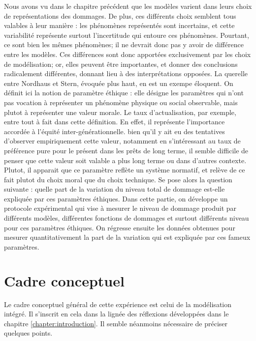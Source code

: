 Nous avons vu dans le chapitre précédent que les modèles varient dans leurs choix de représentations des dommages. De plus, ces différents choix semblent tous valables à leur manière : les phénomènes représentés sont incertains, et cette variabilité représente surtout l'incertitude qui entoure ces phénomènes. Pourtant, ce sont bien les mêmes phénomènes; il ne devrait donc pas y avoir de différence entre les modèles. Ces différences sont donc apportées exclusivement par les choix de modélisation; or, elles peuvent être importantes, et donner des conclusions radicalement différentes, donnant lieu à des interprétations opposées. La querelle entre Nordhaus et Stern, évoquée plus haut, en est un exempe éloquent. On définit ici la notion de paramètre éthique : elle désigne les paramètres qui n'ont pas vocation à représenter un phénomène physique ou social observable, mais plutot à représenter une valeur morale. Le taux d'actualisation, par exemple, entre tout à fait dans cette définition. En effet, il représente l'importance accordée à l'équité inter-générationnelle. bien qu'il y ait eu des tentatives d'observer empiriquement cette valeur, notamment en s'intéressant au taux de préférence pure pour le présent dans les prêts de long terme, il semble difficile de penser que cette valeur soit valable a plus long terme ou dans d'autres contexte. Plutot, il apparait que ce paramètre reflète un système normatif, et relève de ce fait plutot du choix moral que du choix technique. Se pose alors la question suivante : quelle part de la variation du niveau total de dommage est-elle expliquée par ces paramètres éthiques. Dans cette partie, on développe un protocole expérimental qui vise à mesurer le niveau de dommage produit par différents modèles, différentes fonctions de dommages et surtout différents niveau pour ces paramètres éthiques. On régresse ensuite les données obtenues pour mesurer quantitativement la part de la variation qui est expliquée par ces fameux paramètres. 

\section{Cadre conceptuel}

Le cadre conceptuel général de cette expérience est celui de la modélisation intégré. Il s'inscrit en cela dans la lignée des réflexions développées dans le chapitre \ref{chapter:introduction}. Il semble néanmoins nécessaire de préciser quelques points. \\

